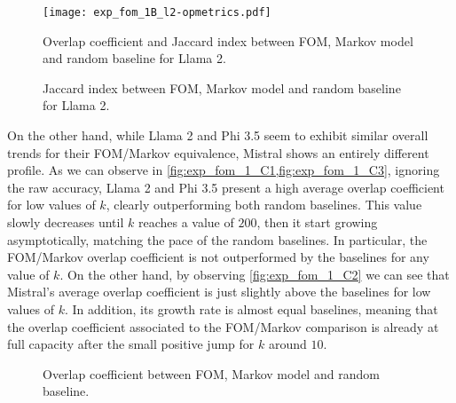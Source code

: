 \begin{figure}[t!]
    \centering
    \texttt{[image: exp\_fom\_1B\_l2-opmetrics.pdf]}
    \caption{Overlap coefficient and Jaccard index between FOM, Markov model and random baseline for Llama 2.}
    \label{fig:exp_fom_1_B1}
\end{figure}
\begin{figure}[t!]
    \caption{Jaccard index between FOM, Markov model and random baseline for Llama 2.}
    \label{fig:exp_fom_1_B}
\end{figure}

On the other hand,  while Llama 2 and Phi 3.5 seem to exhibit similar overall trends for their FOM/Markov equivalence, Mistral shows an entirely different profile.
As we can observe in \cref{fig:exp_fom_1_C1,fig:exp_fom_1_C3}, ignoring the raw accuracy, Llama 2 and Phi 3.5 present a high average overlap coefficient for low values of $k$, clearly outperforming both random baselines.
This value slowly decreases until $k$ reaches a value  of $200$, then it start growing asymptotically, matching the pace of the random baselines.
In particular, the FOM/Markov overlap coefficient is not outperformed by the baselines for any value of $k$.
On the other hand, by observing \cref{fig:exp_fom_1_C2} we can see that Mistral's average overlap coefficient is just slightly above the baselines for low values of $k$.
In addition, its growth rate is almost equal  baselines, meaning that the overlap coefficient associated to the FOM/Markov comparison is already at full capacity after the small positive jump for $k$ around $10$.

\begin{figure}[t!]
    \centering
    \caption{Overlap coefficient between FOM, Markov model and random baseline.}
    \label{fig:exp_fom_1_C}
\end{figure}

